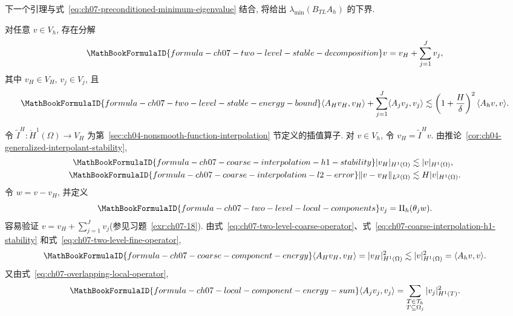 下一个引理与式~\eqref{eq:ch07-preconditioned-minimum-eigenvalue} 结合, 将给出 $\lambda_{\min}(B_{TL}A_h)$ 的下界.

\begin{Lemma}
\label{lem:ch07-two-level-stable-decomposition}
对任意 $v\in V_h$, 存在分解
\[
\MathBookFormulaID{formula-ch07-two-level-stable-decomposition}
v=v_H+\sum_{j=1}^{J}v_j,
\]
其中 $v_H\in V_H$, $v_j\in V_j$, 且
\[
\MathBookFormulaID{formula-ch07-two-level-stable-energy-bound}
\langle A_Hv_H,v_H\rangle
+\sum_{j=1}^{J}\langle A_jv_j,v_j\rangle
\lesssim\left(1+\frac{H}{\delta}\right)^2\langle A_hv,v\rangle.
\]
\end{Lemma}

\begin{Proof}
令 $\widetilde I^H:\mathring H^1(\Omega)\longrightarrow V_H$ 为第~\ref{sec:ch04-nonsmooth-function-interpolation} 节定义的插值算子. 对 $v\in V_h$, 令 $v_H=\widetilde I^Hv$. 由推论~\ref{cor:ch04-generalized-interpolant-stability},
\begin{align}
\MathBookFormulaID{formula-ch07-coarse-interpolation-h1-stability}
|v_H|_{H^1(\Omega)}&\lesssim|v|_{H^1(\Omega)},
\label{eq:ch07-coarse-interpolation-h1-stability}\\
\MathBookFormulaID{formula-ch07-coarse-interpolation-l2-error}
\|v-v_H\|_{L^2(\Omega)}&\lesssim H|v|_{H^1(\Omega)}.
\label{eq:ch07-coarse-interpolation-l2-error}
\end{align}
令 $w=v-v_H$, 并定义
\begin{equation}
\MathBookFormulaID{formula-ch07-two-level-local-components}
\label{eq:ch07-two-level-local-components}
v_j=\Pi_h(\theta_jw).
\end{equation}
容易验证 $v=v_H+\sum_{j=1}^{J}v_j$(参见习题~\ref{exr:ch07-18}). 由式~\eqref{eq:ch07-two-level-coarse-operator}、式~\eqref{eq:ch07-coarse-interpolation-h1-stability} 和式~\eqref{eq:ch07-two-level-fine-operator},
\begin{equation}
\MathBookFormulaID{formula-ch07-coarse-component-energy}
\label{eq:ch07-coarse-component-energy}
\langle A_Hv_H,v_H\rangle
=|v_H|_{H^1(\Omega)}^2
\lesssim|v|_{H^1(\Omega)}^2
=\langle A_hv,v\rangle.
\end{equation}
又由式~\eqref{eq:ch07-overlapping-local-operator},
\begin{equation}
\MathBookFormulaID{formula-ch07-local-component-energy-sum}
\label{eq:ch07-local-component-energy-sum}
\langle A_jv_j,v_j\rangle
=\sum_{\substack{T\in\mathcal T_h\\T\subseteq\Omega_j}}|v_j|_{H^1(T)}^2.

\end{equation}
\end{Proof}
